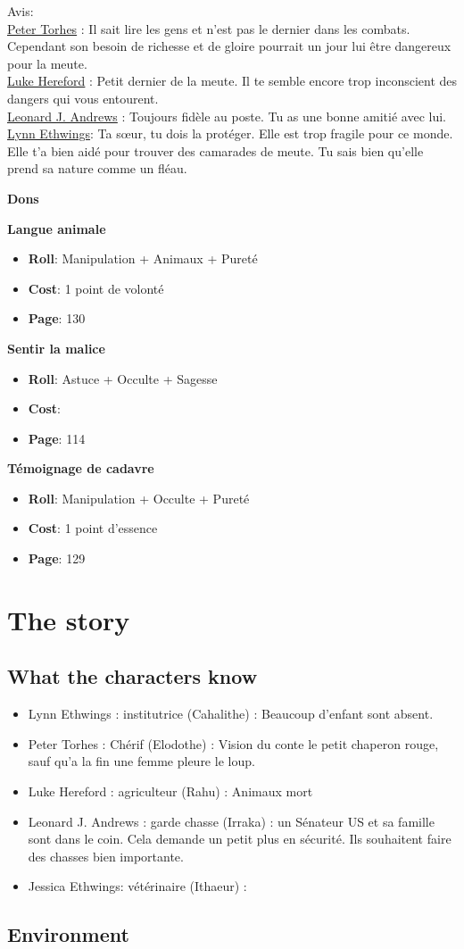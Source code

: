 \documentclass[oneside,12pt]{book}
\newcommand\don[5]{
\textbf{#1} \\
#2
\begin{itemize}
\item{ \textbf{Roll}: #3}
\item{ \textbf{Cost}: #4}
\item{ \textbf{Page}: #5}
\end{itemize}
\vspace{0.5cm}
}
\begin{document}
\begin{flushleft}
\begin{description}
{Avis:\\
\underline{Peter Torhes} : Il sait lire les gens et n'est pas le dernier dans les combats. Cependant son besoin de richesse et de gloire pourrait un jour lui être dangereux pour la meute. \\
\underline{Luke Hereford} : Petit dernier de la meute. Il te semble encore trop inconscient des dangers qui vous entourent.\\
\underline{Leonard J. Andrews} : Toujours fidèle au poste. Tu as une bonne amitié avec lui.\\
\underline{Lynn Ethwings}: Ta sœur, tu dois la protéger. Elle est trop fragile pour ce monde. Elle t'a bien aidé pour trouver des camarades de meute. Tu sais bien qu'elle prend sa nature comme un fléau.\\
}
\end{description}
\clearpage
\textbf{\large Dons} 
\vspace{0.5cm}

\don{Langue animale}{}{Manipulation + Animaux + Pureté}{1 point de volonté}{130}
\don{Sentir la malice}{}{Astuce + Occulte + Sagesse}{}{114}
\don{Témoignage de cadavre}{}{Manipulation + Occulte + Pureté}{1 point d'essence}{129}

\chapter{The story}
\section{What the characters know}
\begin{itemize}
\item Lynn Ethwings :  institutrice (Cahalithe) : Beaucoup d'enfant sont absent. 
\item Peter Torhes :  Chérif (Elodothe) : Vision du conte le petit chaperon rouge, sauf qu'a la fin une femme pleure le loup. 
\item Luke Hereford : agriculteur (Rahu) : Animaux mort 
\item Leonard J. Andrews : garde chasse (Irraka) : un Sénateur US et sa famille sont dans le coin. Cela demande un petit plus en sécurité. Ils souhaitent faire des chasses bien importante. 
\item Jessica  Ethwings: vétérinaire (Ithaeur) : 
\end{itemize}
\section{Environment}

\end{flushleft}
\end{document}
